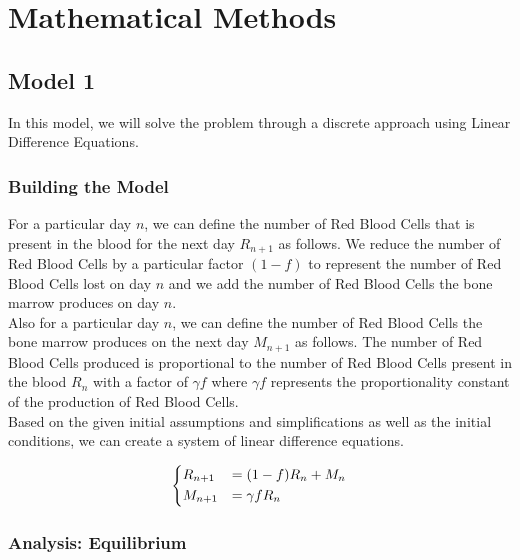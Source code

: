 \section{Mathematical Methods}
\label{sec:mathematical-methods}

\subsection{Model 1}
\label{subsec:model-1}

In this model, we will solve the problem through a discrete approach using Linear Difference Equations.

\subsubsection{Building the Model}

For a particular day $n$, we can define the number of Red Blood Cells that is present in the blood for the next day $R_{n+1}$ as follows. We reduce the number of Red Blood Cells by a particular factor $(1-f)$ to represent the number of Red Blood Cells lost on day $n$ and we add the number of Red Blood Cells the bone marrow produces on day $n$.\\

Also for a particular day $n$, we can define the number of Red Blood Cells the bone marrow produces on the next day $M_{n+1}$ as follows. The number of Red Blood Cells produced is proportional to the number of Red Blood Cells present in the blood $R_n$ with a factor of $\gamma f$ where $\gamma f$ represents the proportionality constant of the production of Red Blood Cells.\\

Based on the given initial assumptions and simplifications as well as the initial conditions, we can create a system of linear difference equations.

\begin{equation}
    \begin{dcases}
        R_{n+1} &= (1-f)R_n + M_n\\
        M_{n+1} &= \gamma fR_n
    \end{dcases}
    \label{eq:1}
\end{equation}

\subsubsection{Analysis: Equilibrium}

